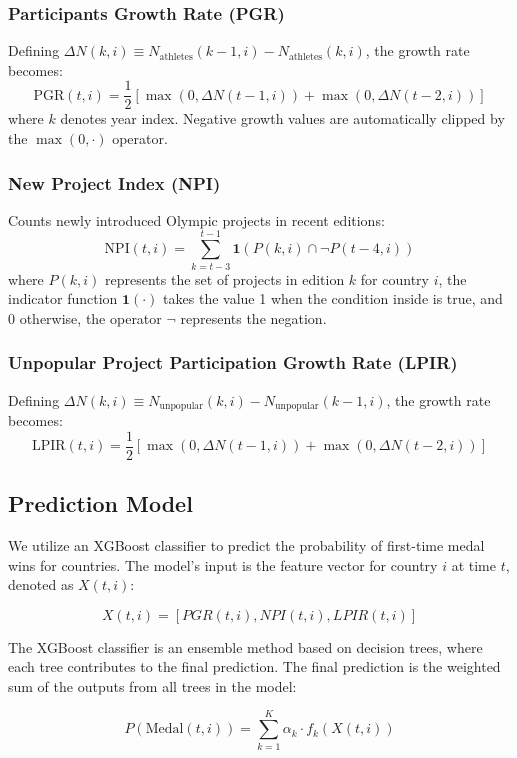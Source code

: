 \documentclass{mcmthesis}
\begin{document}
\subsubsection{Participants Growth Rate (PGR)}
Defining \(\Delta N(k,i) \equiv N_{\text{athletes}}(k-1,i) - N_{\text{athletes}}(k,i)\), the growth rate becomes:
\[
\text{PGR}(t,i) = \frac{1}{2} \left[ \max(0,\Delta N(t-1,i)) + \max(0,\Delta N(t-2,i)) \right]
\]
where \(k\) denotes year index. Negative growth values are automatically clipped by the \(\max(0,\cdot)\) operator.

\subsubsection{New Project Index (NPI)}
Counts newly introduced Olympic projects in recent editions:
\[
\text{NPI}(t,i) = \sum_{k=t-3}^{t-1} \mathbf{1}\left( P(k,i) \cap \neg P(t-4, i) \right)
\]
where \( P(k, i) \) represents the set of projects in edition \( k \) for country \( i \), the indicator function \( \mathbf{1}(\cdot) \) takes the value 1 when the condition inside is true, and 0 otherwise, the operator \(\neg\) represents the negation.

\subsubsection{Unpopular Project Participation Growth Rate (LPIR)}
Defining \(\Delta N(k,i) \equiv N_{\text{unpopular}}(k,i) - N_{\text{unpopular}}(k-1,i)\), the growth rate becomes:
\[
\text{LPIR}(t,i) = \frac{1}{2} \left[ \max(0, \Delta N(t-1,i)) + \max(0, \Delta N(t-2,i)) \right]
\]


\subsection{Prediction Model}

We utilize an XGBoost classifier to predict the probability of first-time medal wins for countries. The model’s input is the feature vector for country \( i \) at time \( t \), denoted as \( X(t,i) \):

\[
X(t,i) = [PGR(t,i), NPI(t,i), LPIR(t,i)]
\]

The XGBoost classifier is an ensemble method based on decision trees, where each tree contributes to the final prediction. The final prediction is the weighted sum of the outputs from all trees in the model:

\[
P(\text{Medal}(t,i)) = \sum_{k=1}^{K} \alpha_k \cdot f_k(X(t,i))
\]
\end{document}

